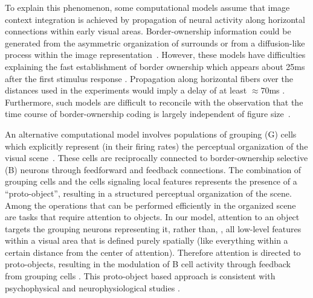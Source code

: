 To explain this phenomenon, some computational models assume that image context integration is achieved by propagation of neural activity along horizontal connections within early visual areas. Border-ownership information could be generated from the asymmetric organization of surrounds \citep{Nishimura_Sakai04, Nishimura_Sakai05,Sakai_etal12} or from a diffusion-like process within the image representation~\citep{Grossberg94,Grossberg97,
Baek_Sajda05, Kikuchi_Akashi01, Pao_etal99,
Zhaoping05}. However, these models have difficulties explaining the
fast establishment of border ownership which appears about 25ms after
the first stimulus response \citep{Zhou_etal00}. Propagation along horizontal fibers over the distances used in the experiments would imply a delay of at least $\approx70$ms \citep[][based on the conduction velocity of horizontal fibers in primate V1 cortex; we are not aware of corresponding data for V2]{Girard_etal01}. Furthermore, such models are difficult to reconcile with the observation that the time course of border-ownership coding is largely independent of figure size~\citep{Sugihara_etal11}.

An alternative computational model involves populations of grouping
(G) cells which explicitly represent (in their firing rates) the
perceptual organization of the visual scene~\citep{Schutze_etal03,Craft_etal07}. These cells are reciprocally connected to border-ownership selective (B) neurons through feedforward and feedback connections.  The combination of grouping cells and the cells signaling local features represents the presence of a ``proto-object''\citep{Rensink00a}, resulting in a structured perceptual
organization of the scene. Among the operations that can be performed
efficiently in the organized scene are tasks that require attention to objects. In our model, attention to an object targets the grouping neurons representing it, rather than, \eg, all low-level features within a visual area that is defined purely spatially (like everything within a certain distance from the center of attention). Therefore attention is directed to proto-objects, resulting in the modulation of B cell activity through feedback from grouping cells \citep{Mihalas_etal11b}. This proto-object based approach is consistent with psychophysical and neurophysiological studies
\citep[\eg][]{Duncan84,Egly_etal94,Scholl01,Kimchi_etal07,Qiu_etal07,Ho_Yeh09,Poort_etal12}.

